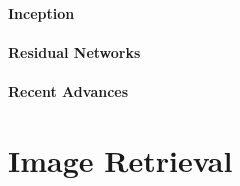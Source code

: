 
\paragraph{Inception}

\paragraph{Residual Networks}

\paragraph{Recent Advances}




\section{Image Retrieval}
\label{sec:back:image-retrieval}


